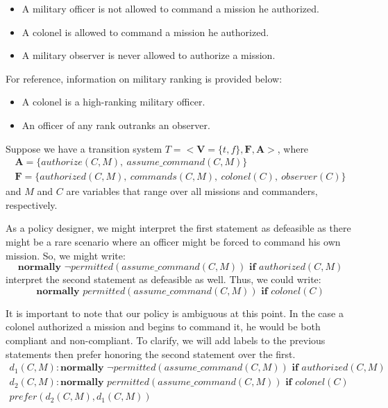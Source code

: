\begin{itemize}
    \item A military officer is not allowed to command a mission he authorized.
    \item A colonel is allowed to command a mission he authorized.
    \item A military observer is never allowed to authorize a mission.
\end{itemize}

For reference, information on military ranking is provided below:

\begin{itemize}
    \item A colonel is a high-ranking military officer.
    \item An officer of any rank outranks an observer.
\end{itemize}

Suppose we have a transition system $T=<\boldsymbol{V}=\{t,f\},\boldsymbol{F},\boldsymbol{A}>$, where
\begin{gather*}
    \boldsymbol{A}=\{authorize(C,M),\ assume\_command(C, M)\} \\
    \boldsymbol{F}=\{authorized(C,M),\ commands(C,M),\ colonel(C),\ observer(C)\}
\end{gather*}
and $M$ and $C$ are variables that range over all missions and commanders, respectively.

As a policy designer, we might interpret the first statement as defeasible as there might be a rare scenario where an officer might be forced to command his own mission.
So, we might write:
\[
\textbf{normally } \neg permitted(assume\_command(C, M)) \textbf{ if } authorized(C, M)
\]
\citet{gelfond_authorization_2008} interpret the second statement as defeasible as well.
Thus, we could write:
\[
\textbf{normally } permitted(assume\_command(C, M)) \textbf{ if } colonel(C)
\]

It is important to note that our policy is ambiguous at this point.
In the case a colonel authorized a mission and begins to command it, he would be both compliant and non-compliant.
To clarify, we will add labels to the previous statements then prefer honoring the second statement over the first.
\begin{gather}
    d_1(C, M): \textbf{normally } \neg permitted(assume\_command(C, M)) \textbf{ if } authorized(C, M) \label{eq:apl_example_policy_1} \\
    d_2(C, M): \textbf{normally } permitted(assume\_command(C, M)) \textbf{ if } colonel(C) \label{eq:apl_example_policy_2} \\
    prefer(d_2(C,M),d_1(C,M)) \label{eq:apl_example_policy_3}
\end{gather}

